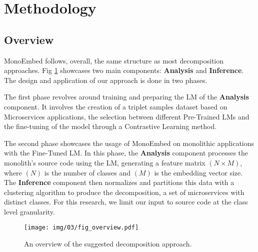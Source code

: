 \section{Methodology}\label{sec:approach}


\subsection{Overview}\label{subsec:overview}
MonoEmbed follows, overall, the same structure as most decomposition approaches. Fig     \ref{fig:overview} showcases two main components: \textbf{Analysis} and \textbf{Inference}. The design and application of our approach is done in two phases.

The first phase revolves around training and preparing the LM of the \textbf{Analysis} component. It involves the creation of a triplet samples dataset based on Microservices applications, the selection between different Pre-Trained LMs and the fine-tuning of the model through a Contrastive Learning method.

The second phase showcases the usage of MonoEmbed on monolithic applications with the Fine-Tuned LM. In this phase, the \textbf{Analysis} component processes the monolith's source code using the LM, generating a feature matrix  \( (N{\times}M) \), where \( (N) \) is the number of classes and \( (M) \) is the embedding vector size. The \textbf{Inference} component then normalizes and partitions this data with a clustering algorithm to produce the decomposition, a set of microservices with distinct classes. For this research, we limit our input to source code at the class level granularity.



\begin{figure}[ht]
\centering
\texttt{[image: img/03/fig\_overview.pdf]}
\caption{An overview of the suggested decomposition approach.} \label{fig:overview}
\end{figure}







